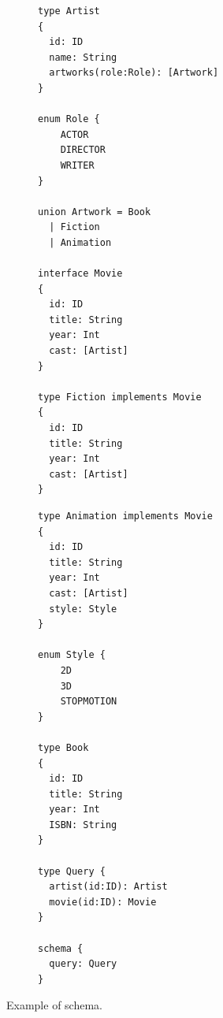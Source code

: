 \begin{figure}
    \centering
    \begin{subfigure}{.5\linewidth}
    
    \begin{verbatim}
type Artist
{
  id: ID
  name: String
  artworks(role:Role): [Artwork]
}

enum Role { 
	ACTOR
	DIRECTOR
	WRITER
}

union Artwork = Book
  | Fiction
  | Animation 

interface Movie
{
  id: ID		
  title: String
  year: Int
  cast: [Artist]
}

type Fiction implements Movie
{
  id: ID		
  title: String
  year: Int
  cast: [Artist]
}
    \end{verbatim}
    \end{subfigure}%
    \begin{subfigure}{.5\linewidth}
    \begin{verbatim}
type Animation implements Movie
{
  id: ID		
  title: String
  year: Int
  cast: [Artist]
  style: Style
}

enum Style {
	2D
	3D
	STOPMOTION
}

type Book
{
  id: ID
  title: String
  year: Int
  ISBN: String
}

type Query {
  artist(id:ID): Artist
  movie(id:ID): Movie
}

schema {
  query: Query
}
    \end{verbatim}
    \end{subfigure}
    
    \caption{Example of \gql schema.}
    \label{fig:schema_ex}
\end{figure}

